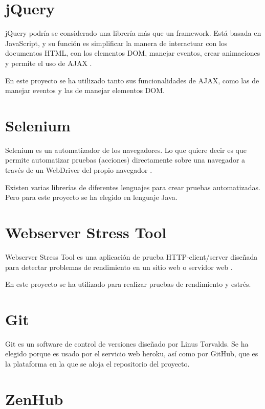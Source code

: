 \section{jQuery}\label{jquery}

jQuery podría se considerado una librería más que un framework. Está basada en JavaScript, y su función es simplificar la manera de interactuar con los documentos HTML, con los elementos DOM, manejar eventos, crear animaciones y permite el uso de AJAX \cite{jquerybib}.

En este proyecto se ha utilizado tanto sus funcionalidades de AJAX, como las de manejar eventos y las de manejar elementos DOM.

\section{Selenium}\label{selenium}

Selenium es un automatizador de los navegadores. Lo que quiere decir es que permite automatizar pruebas (acciones) directamente sobre una navegador a través de un WebDriver del propio navegador \cite{seleniumbib}.

Existen varias librerías de diferentes lenguajes para crear pruebas automatizadas. Pero para este proyecto se ha elegido en lenguaje Java.

\section{Webserver Stress Tool}\label{WebserverStressTool} 

Webserver Stress Tool es una aplicación de prueba HTTP-client/server diseñada para detectar problemas de rendimiento en un sitio web o servidor web \cite{webserverbib}.

En este proyecto se ha utilizado para realizar pruebas de rendimiento y estrés.

\section{Git}\label{Git}

Git es un software de control de versiones diseñado por Linus Torvalds. Se ha elegido porque es usado por el servicio web heroku, así como por GitHub, que es la plataforma en la que se aloja el repositorio del proyecto.

\section{ZenHub}\label{zenhub}

